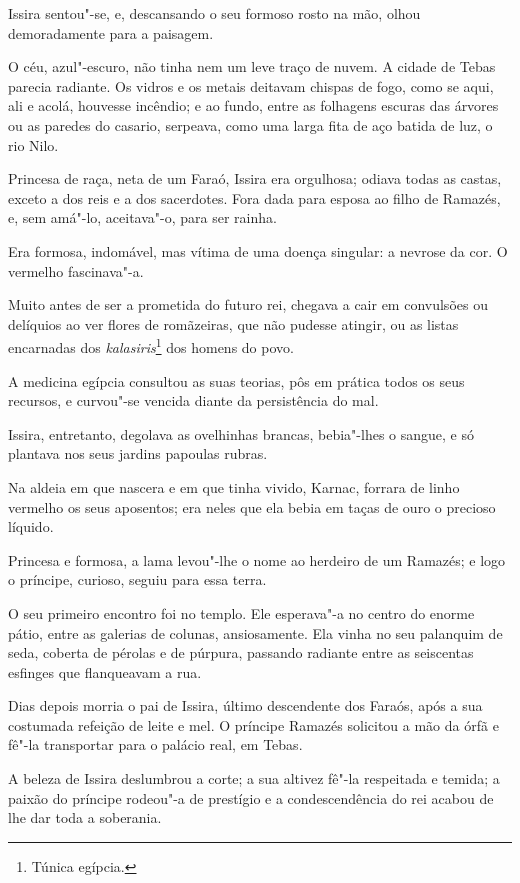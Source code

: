 Issira sentou"-se, e, descansando o seu formoso rosto na mão, olhou
demoradamente para a paisagem.

O céu, azul"-escuro, não tinha nem um leve traço de nuvem. A cidade de
Tebas parecia radiante. Os vidros e os metais deitavam chispas de fogo,
como se aqui, ali e acolá, houvesse incêndio; e ao fundo, entre as
folhagens escuras das árvores ou as paredes do casario, serpeava, como
uma larga fita de aço batida de luz, o rio Nilo.

Princesa de raça, neta de um Faraó, Issira era orgulhosa; odiava todas
as castas, exceto a dos reis e a dos sacerdotes. Fora dada para esposa
ao filho de Ramazés, e, sem amá"-lo, aceitava"-o, para ser rainha.

Era formosa, indomável, mas vítima de uma doença singular: a nevrose da
cor. O vermelho fascinava"-a.

Muito antes de ser a prometida do futuro rei, chegava a cair em
convulsões ou delíquios ao ver flores de romãzeiras, que não pudesse
atingir, ou as listas encarnadas dos \emph{kalasiris}\footnote{Túnica
  egípcia.} dos homens do povo.

A medicina egípcia consultou as suas teorias, pôs em prática todos os
seus recursos, e curvou"-se vencida diante da persistência do mal.

Issira, entretanto, degolava as ovelhinhas brancas, bebia"-lhes o sangue,
e só plantava nos seus jardins papoulas rubras.

Na aldeia em que nascera e em que tinha vivido, Karnac, forrara de linho
vermelho os seus aposentos; era neles que ela bebia em taças de ouro o
precioso líquido.

Princesa e formosa, a lama levou"-lhe o nome ao herdeiro de um Ramazés; e
logo o príncipe, curioso, seguiu para essa terra.

O seu primeiro encontro foi no templo. Ele esperava"-a no centro do
enorme pátio, entre as galerias de colunas, ansiosamente. Ela vinha no
seu palanquim de seda, coberta de pérolas e de púrpura, passando
radiante entre as seiscentas esfinges que flanqueavam a rua.

Dias depois morria o pai de Issira, último descendente dos Faraós, após
a sua costumada refeição de leite e mel. O príncipe Ramazés solicitou a
mão da órfã e fê"-la transportar para o palácio real, em Tebas.

A beleza de Issira deslumbrou a corte; a sua altivez fê"-la respeitada e
temida; a paixão do príncipe rodeou"-a de prestígio e a condescendência
do rei acabou de lhe dar toda a soberania.

